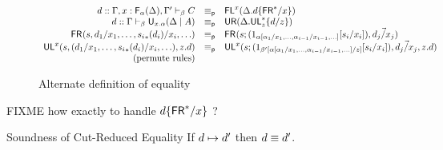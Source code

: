 \begin{figure}
\[\begin{array}{rcll}
\\
d :: \Gamma,x:\mathsf{F}_{\alpha}(\Delta),\Gamma' \vdash_{\beta} C & \equiv_{\mathsf{p}} & \mathsf{FL}^{x}(\Delta.d\{\mathsf{FR}^*/x\})\\
d :: \Gamma \vdash_{\beta} \mathsf{U}_{x.\alpha}(\Delta \mid A) & \equiv_{\mathsf{p}} & \mathsf{UR}(\Delta.\mathsf{UL}^*_{z}\{d/z\})\\
\mathsf{FR}_{}(s,d_1/x_1,\ldots,{s_i}_*(d_i)/x_i,\ldots) & \equiv_{\mathsf{p}} & \mathsf{FR}_{}(s;(1_{\alpha[\alpha_1/x_1,\ldots,\alpha_{i-1}/x_{i-1},\ldots]}[s_i/x_i]),\vec{d_j/x_j})\\
\mathsf{UL}^{x}_{}(s,(d_1/x_1,\ldots,{s_i}_*(d_i)/x_i,\ldots),z.d) & \equiv_{\mathsf{p}} & \mathsf{UL}^{x}_{}(s;(1_{\beta'[\alpha[\alpha_1/x_1,\ldots,\alpha_{i-1}/x_{i-1},\ldots]/z]}[s_i/x_i]),\vec{d_j/x_j},z.d)\\
\text{(permute rules)}
\end{array}
\]
\caption{Alternate definition of equality}
\end{figure}

FIXME how exactly to handle $d\{\mathsf{FR}^*/x\}$ ?

\begin{theorem}{Soundness of Cut-Reduced Equality}
If $d \mapsto d'$ then $d \equiv d'$.
\end{theorem}
